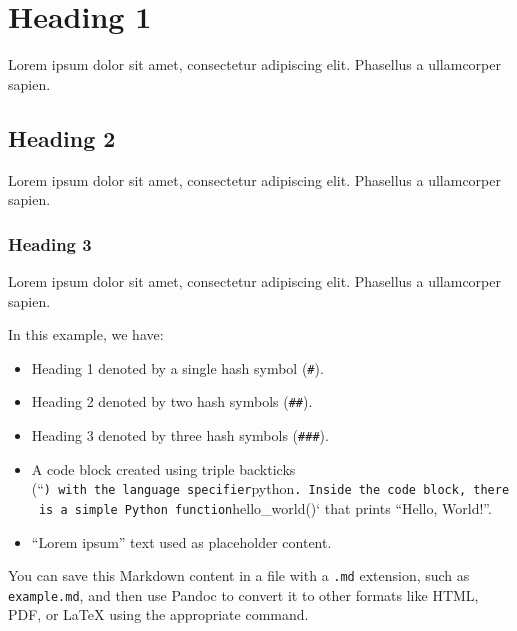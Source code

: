 \documentclass{article}
\providecommand{\tightlist}{\relax}
\begin{document}
\pretitle{\begin{center}\LARGE} %
\posttitle{\par\end{center}\vskip 0.5em} %

\title{}
\author{}
\date{\today}

\maketitle

\tableofcontents

\clearpage

\section{Heading 1}\label{heading-1}

Lorem ipsum dolor sit amet, consectetur adipiscing elit. Phasellus a
ullamcorper sapien.

\subsection{Heading 2}\label{heading-2}

Lorem ipsum dolor sit amet, consectetur adipiscing elit. Phasellus a
ullamcorper sapien.

\subsubsection{Heading 3}\label{heading-3}

Lorem ipsum dolor sit amet, consectetur adipiscing elit. Phasellus a
ullamcorper sapien.

\begin{Shaded}
\begin{Highlighting}[]
    \NormalTok{(}\NormalTok{)}

\end{Highlighting}
\end{Shaded}

In this example, we have:

\begin{itemize}
\tightlist
\item
  Heading 1 denoted by a single hash symbol (\texttt{\#}).
\item
  Heading 2 denoted by two hash symbols (\texttt{\#\#}).
\item
  Heading 3 denoted by three hash symbols (\texttt{\#\#\#}).
\item
  A code block created using triple backticks
  (``\texttt{)\ with\ the\ language\ specifier}python\texttt{.\ Inside\ the\ code\ block,\ there\ is\ a\ simple\ Python\ function}hello\_world()`
  that prints ``Hello, World!''.
\item
  ``Lorem ipsum'' text used as placeholder content.
\end{itemize}

You can save this Markdown content in a file with a \texttt{.md}
extension, such as \texttt{example.md}, and then use Pandoc to convert
it to other formats like HTML, PDF, or LaTeX using the appropriate
command.
\end{document}
